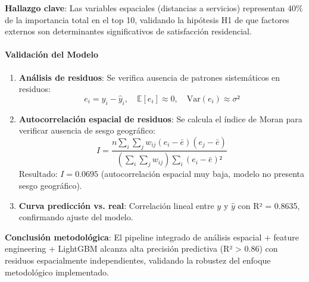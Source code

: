 \textbf{Hallazgo clave}: Las variables espaciales (distancias a servicios) representan 40\% de la importancia total en el top 10, validando la hipótesis H1 de que factores externos son determinantes significativos de satisfacción residencial.

\paragraph{Validación del Modelo}

\begin{enumerate}
    \item \textbf{Análisis de residuos}: Se verifica ausencia de patrones sistemáticos en residuos:
    \begin{equation}
    e_i = y_i - \hat{y}_i, \quad \mathbb{E}[e_i] \approx 0, \quad \text{Var}(e_i) \approx \sigma²
    \end{equation}
    
    \item \textbf{Autocorrelación espacial de residuos}: Se calcula el índice de Moran para verificar ausencia de sesgo geográfico:
    \begin{equation}
    I = \frac{n \sum_i \sum_j w_{ij}(e_i - \bar{e})(e_j - \bar{e})}{\left(\sum_i \sum_j w_{ij}\right) \sum_i (e_i - \bar{e})²}
    \end{equation}
    Resultado: $I = 0.0695$ (autocorrelación espacial muy baja, modelo no presenta sesgo geográfico).
    
    \item \textbf{Curva predicción vs. real}: Correlación lineal entre $y$ y $\hat{y}$ con R² = 0.8635, confirmando ajuste del modelo.
\end{enumerate}

\textbf{Conclusión metodológica}: El pipeline integrado de análisis espacial + feature engineering + LightGBM alcanza alta precisión predictiva (R² > 0.86) con residuos espacialmente independientes, validando la robustez del enfoque metodológico implementado.




